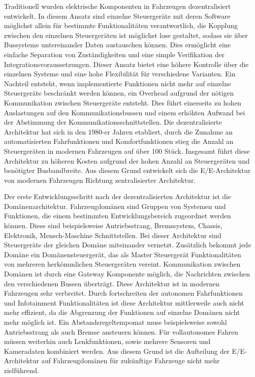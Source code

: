 Traditionell wurden elektrische Komponenten in Fahrzeugen dezentralisiert entwickelt. In diesem Ansatz sind einzelne Steuergeräte mit deren Software möglichst allein für bestimmte Funktionalitäten verantwortlich, die Kopplung zwischen den einzelnen Steuergeräten ist möglichst lose gestaltet, sodass sie über Bussysteme untereinander Daten austauschen können. Dies ermöglicht eine einfache Separation von Zuständigkeiten und eine simple Verifikation der Integrationsvoraussetzungen. \cite{DiNatale2010} Dieser Ansatz bietet eine höhere Kontrolle über die einzelnen Systeme und eine hohe Flexibilität für verschiedene Varianten. Ein Nachteil entsteht, wenn implementierte Funktionen nicht mehr auf einzelne Steuergeräte beschränkt werden können, ein Overhead aufgrund der nötigen Kommunikation zwischen Steuergeräte entsteht. Dies führt einerseits zu hohen Auslastungen auf den Kommunikationsbussen und einem erhöhten Aufwand bei der Abstimmung der Kommunikationsschnittstellen. \cite{Reinhardt2013} Die dezentralisierte Architektur hat sich in den 1980-er Jahren etabliert, durch die Zunahme an automatisierten Fahrfunktionen und Komfortfunktionen stieg die Anzahl an Steuergeräten in modernen Fahrzeugen auf über 100 Stück. \cite{Amend2017} Insgesamt führt diese Architektur zu höheren Kosten aufgrund der hohen Anzahl an Steuergeräten und benötigter Busbandbreite. Aus diesem Grund entwickelt sich die E/E-Architektur von modernen Fahrzeugen Richtung zentralisierter Architektur. 

Der erste Entwicklungsschritt nach der dezentralisierten Architektur ist die Domänenarchitektur. Fahrzeugdomänen sind Gruppen von Systemen und Funktionen, die einem bestimmten Entwicklungsbereich zugeordnet werden können. Diese sind beispielsweise Antriebsstrang, Bremssystem, Chassis, Elektronik, Mensch-Maschine Schnittstellen. \cite{continental2024} Bei dieser Architektur sind Steuergeräte der gleichen Domäne miteinander vernetzt. Zusätzlich bekommt jede Domäne ein Domänensteuergerät, das als Master Steuergerät Funktionalitäten von mehreren herkömmlichen Steuergeräten vereint. Kommunikation zwischen Domänen ist durch eine Gateway Komponente möglich, die Nachrichten zwischen den verschiedenen Bussen überträgt. Diese Architektur ist in modernen Fahrzeugen sehr verbreitet. Durch fortschreiten der autonomen Fahrfunktionen und Infotainment Funktionalitäten ist diese Architektur mittlerweile auch nicht mehr effizient, da die Abgrenzung der Funktionen auf einzelne Domänen nicht mehr möglich ist. Ein Abstandsregeltempomat muss beispielsweise sowohl Antriebsstrang als auch Bremse ansteuern können. Für vollautonomes Fahren müssen weiterhin auch Lenkfunktionen, sowie mehrere Sensoren und Kameradaten kombiniert werden. Aus diesem Grund ist die Aufteilung der E/E-Architektur auf Fahrzeugdomänen für zukünftige Fahrzeuge nicht mehr zielführend. 

